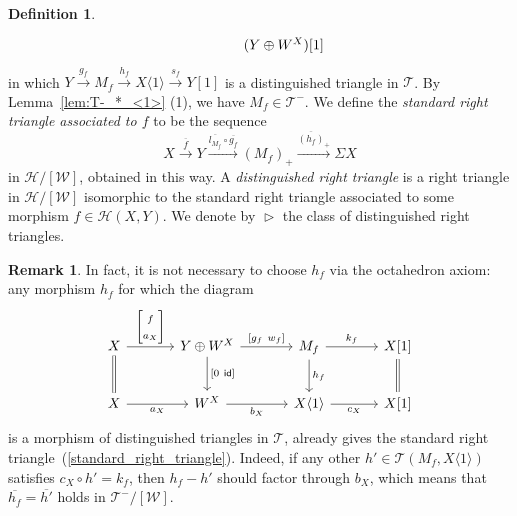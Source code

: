 \documentclass[a4paper,reqno,10pt]{amsart}
\DeclareRobustCommand{\darkblueedit}[1]{#1}
\theoremstyle{definition}
\newtheorem{definition}[definition]{Definition}
\theoremstyle{definition}
\newtheorem{remark}[remark]{Remark}
\theoremstyle{definition}
\theoremstyle{definition}
\theoremstyle{plain}
\newcommand{\id}{\mathsf{id}}
\newcommand{\CH}{\mathcal{H}}
\newcommand{\CT}{\mathcal{T}}
\newcommand{\CW}{\mathcal{W}}
\begin{document}
\begin{definition}
\begin{equation}
\begin{tikzcd}[row sep=0.8cm, column sep=1.2cm]
&(Y\oplus W^X)[1]
\end{tikzcd}
\end{equation}
in which $Y\xrightarrow{g_f}M_f\xrightarrow{h_f}X\langle1\rangle\xrightarrow{s_f}Y[1]$ is a distinguished triangle in $\CT$.
By Lemma~\ref{lem:T-_*_<1>} {\rm (1)}, we have $M_f\in\CT^-$.
We define \darkblueedit{the} \emph{standard right triangle associated to $f$} to be the sequence
\begin{equation}\label{standard_right_triangle}
X\xrightarrow{\overline{f}}Y\xrightarrow{\overline{l_{M_f}}\circ \overline{g_f}}(M_f)_+\xrightarrow{\overline{(h_f)}_+}\Sigma X
\end{equation}
in $\CH/[\CW]$, obtained in this way.
A \emph{distinguished right triangle} is a right triangle %
in $\CH/[\CW]$ isomorphic to the standard right triangle associated to some morphism $f\in\CH(X,Y)$. We denote by $\vartriangleright$ the class of distinguished right triangles. 
\end{definition}

\begin{remark}\label{rem:standard_h_f}
In fact, it is not necessary to choose $h_f$ via the octahedron axiom:
any morphism $h_f$ for which the diagram
\[
\begin{tikzcd}[row sep=0.8cm, column sep=1.2cm]
X \arrow{r}{\begin{bmatrix}f\\ a_X\end{bmatrix}}\arrow[d, equal]
&Y\oplus W^X \arrow{d}{{[}0\ \id{]}} \arrow{r}{{[}g_f\ w_f{]}}
&M_f\arrow{r}{k_f} \arrow{d}{h_f}
&X{[}1{]} \arrow[d, equal]
\\
X\arrow{r}[swap]{a_X}
&W^X\arrow{r}[swap]{b_X}
&X \langle1\rangle \arrow{r}[swap]{c_X}
&X{[}1{]}
\end{tikzcd}\]
is a morphism of distinguished triangles in $\CT$,
already gives the standard right triangle~(\ref{standard_right_triangle}).
Indeed, if any other $h'\in\CT(M_f,X\langle1\rangle)$ satisfies $c_X\circ h'=k_f$, then $h_f-h'$ should factor through $b_X$, which means that $\overline{h_f}=\overline{h'}$ holds in 
\color{blue}
$\CT^-/[\CW]$.
\normalcolor
\end{remark}
\end{document}
